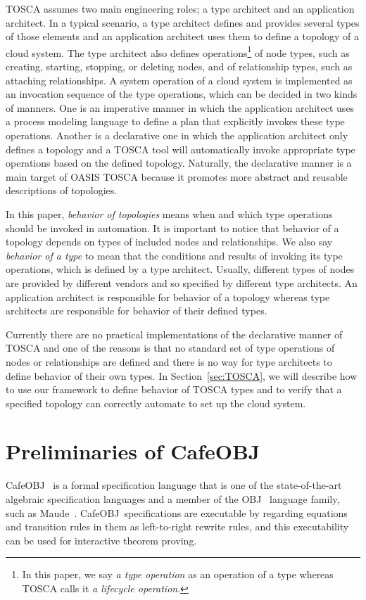 \documentclass[12pt]{report}
\newcommand{\cafeobj}{{\sf CafeOBJ}~}
\begin{document}
TOSCA assumes two main engineering roles; a type architect and an
application architect. In a typical scenario, a type architect defines
and provides several types of those elements and an application
architect uses them to define a topology of a cloud system. The
type architect also defines operations\footnote{In this paper, we say
  {\it a type operation} as an operation of a type whereas TOSCA calls
  it {\it a lifecycle operation}.} of node types, such as creating,
starting, stopping, or deleting nodes, and of relationship types, such
as attaching relationships. A system operation of a cloud system
is implemented as an invocation sequence of the type operations, which
can be decided in two kinds of manners. One is an imperative manner in
which the application architect uses a process modeling language to
define a plan that explicitly invokes these type operations. Another
is a declarative one in which the application architect only defines a
topology and a TOSCA tool will automatically invoke appropriate type
operations based on the defined topology. Naturally, the declarative
manner is a main target of OASIS TOSCA because it promotes more
abstract and reusable descriptions of topologies.

In this paper, {\it behavior of topologies} means when
and which type operations should be invoked in automation. It is
important to notice that behavior of a topology depends
on types of included nodes and relationships. We also say
{\it behavior of a type} to mean that the conditions and
results of invoking its type operations, which is defined by a type
architect. Usually, different types of nodes are provided by different
vendors and so specified by different type architects. An application
architect is responsible for behavior of a topology
whereas type architects are responsible for behavior of
their defined types.

Currently there are no practical implementations of the declarative
manner of TOSCA and one of the reasons is that no standard set of type
operations of nodes or relationships are defined and there is no way
for type architects to define behavior of their own types.  In
Section~\ref{sec:TOSCA}, we will describe how to use our framework to
define behavior of TOSCA types and to verify that a specified
topology can correctly automate to set up the cloud system.

\chapter{Preliminaries of \cafeobj}
\label{chap:pre}
\cafeobj\cite{cafeobj} is a formal specification language that is one
of the state-of-the-art algebraic specification languages and a member
of the {\sf OBJ}~\cite{OBJ} language family, such as {\sf
  Maude}~\cite{Maude14}.  \cafeobj specifications are executable by
regarding equations and transition rules in them as left-to-right
rewrite rules, and this executability can be used for interactive
theorem proving.
\end{document}
